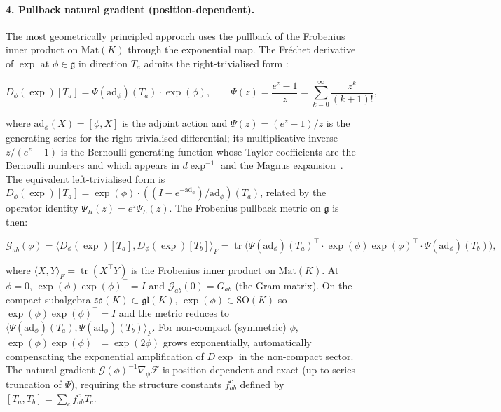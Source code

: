 \documentclass[twoside,11pt]{article}
\begin{document}
\paragraph{4. Pullback natural gradient (position-dependent).}
The most geometrically principled approach uses the pullback of the Frobenius inner product on $\mathrm{Mat}(K)$ through the exponential map. The Fréchet derivative of $\exp$ at $\phi \in \mathfrak{g}$ in direction $T_a$ admits the right-trivialised form \citep[\S2.7 / Theorem 5.4]{Hall2015}:

\begin{equation}
D_\phi(\exp)[T_a] = \Psi(\mathrm{ad}_\phi)(T_a) \cdot \exp(\phi), \qquad \Psi(z) = \frac{e^z - 1}{z} = \sum_{k=0}^{\infty} \frac{z^k}{(k+1)!},
\end{equation}

where $\mathrm{ad}_\phi(X) = [\phi, X]$ is the adjoint action and $\Psi(z) = (e^z - 1)/z$ is the generating series for the right-trivialised differential; its multiplicative inverse $z/(e^z-1)$ is the Bernoulli generating function whose Taylor coefficients are the Bernoulli numbers and which appears in $d\exp^{-1}$ and the Magnus expansion~\citep{Hall2015}. The equivalent left-trivialised form is $D_\phi(\exp)[T_a] = \exp(\phi) \cdot ((I - e^{-\mathrm{ad}_\phi})/\mathrm{ad}_\phi)(T_a)$, related by the operator identity $\Psi_R(z) = e^z \Psi_L(z)$. The Frobenius pullback metric on $\mathfrak{g}$ is then:

\begin{equation}
\mathcal{G}_{ab}(\phi)
=\langle D_\phi(\exp)[T_a], D_\phi(\exp)[T_b]\rangle_F
= \operatorname{tr}\bigl(\Psi(\mathrm{ad}_\phi)(T_a)^\top \cdot \exp(\phi)\exp(\phi)^\top \cdot \Psi(\mathrm{ad}_\phi)(T_b)\bigr),
\label{eq:pullback_metric}
\end{equation}

where $\langle X, Y \rangle_F = \operatorname{tr}(X^\top Y)$ is the Frobenius inner product on $\mathrm{Mat}(K)$. At $\phi = 0$, $\exp(\phi)\exp(\phi)^\top = I$ and $\mathcal{G}_{ab}(0) = G_{ab}$ (the Gram matrix). On the compact subalgebra $\mathfrak{so}(K) \subset \mathfrak{gl}(K)$, $\exp(\phi) \in \mathrm{SO}(K)$ so $\exp(\phi)\exp(\phi)^\top = I$ and the metric reduces to $\langle \Psi(\mathrm{ad}_\phi)(T_a), \Psi(\mathrm{ad}_\phi)(T_b)\rangle_F$. For non-compact (symmetric) $\phi$, $\exp(\phi)\exp(\phi)^\top = \exp(2\phi)$ grows exponentially, automatically compensating the exponential amplification of $D\exp$ in the non-compact sector. The natural gradient $\mathcal{G}(\phi)^{-1} \nabla_\phi \mathcal{F}$ is position-dependent and exact (up to series truncation of $\Psi$), requiring the structure constants $f^c_{ab}$ defined by $[T_a, T_b] = \sum_c f^c_{ab} T_c$.
\end{document}

